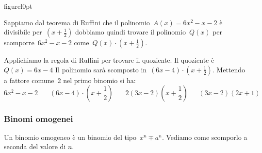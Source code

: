 \begin{wrapfloat}{figure}{l}{0pt}
 
\end{wrapfloat}
Sappiamo dal teorema di Ruffini che il polinomio~\(A(x)=6x^{2}-x-2\) è
divisibile per~\(\left(x+\frac{1}{2}\right)\) dobbiamo quindi trovare il
polinomio~\(Q(x)\) per scomporre~\(6x^{2}-x-2\) 
come~\(Q(x)\cdot \left(x+\frac{1}{2}\right)\).

Applichiamo la regola di Ruffini per trovare il quoziente. 
Il quoziente è~\(Q(x)=6x-4\)
Il polinomio sarà scomposto in~\((6x-4)\cdot\left(x+\frac{1}{2}\right)\).
Mettendo a fattore comune~2 nel primo binomio si ha:
\[6x^{2}-x-2\ =
\ (6x-4)\cdot \left(x+\frac{1}{2}\right)\ =
\ 2(3x-2)\left(x+\frac{1}{2}\right)\ =(3x-2)(2x+1)\]





\subsubsection{Binomi omogenei}
\label{subsubsec:divpol_binomo}

Un binomio omogeneo è un binomio del tipo~\(x^{n} \mp a^{n}\).
Vediamo come scomporlo a seconda del valore di \(n\).


